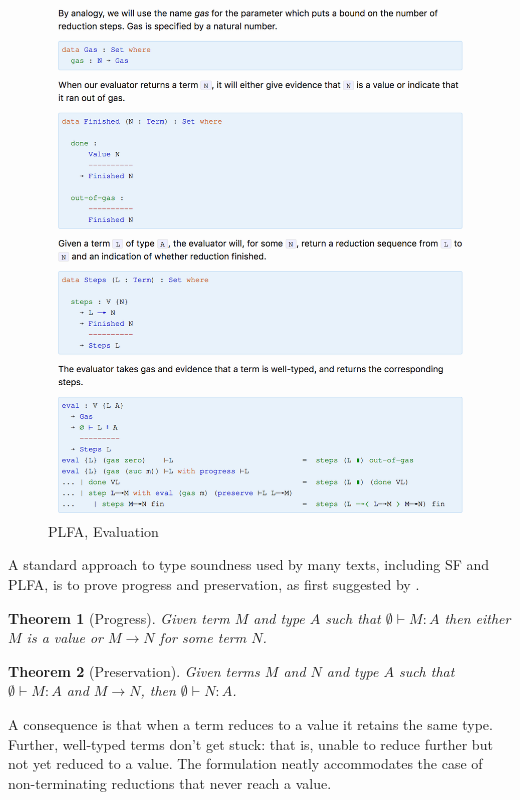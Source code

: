 \documentclass[preprint,authoryear]{elsarticle}
\newtheorem{theorem}{Theorem}
\begin{document}
\begin{figure}
  \includegraphics[width=\textwidth]{figures/plfa-eval.png}
  \caption{PLFA, Evaluation}
  \label{fig:plfa-eval}
\end{figure}  

A standard approach to type soundness used by many texts,
including SF and PLFA, is to prove progress and preservation,
as first suggested by \citet{Wright-and-Felleisen-1994}.

\begin{theorem}[Progress] Given term $M$ and type $A$ such that
$\emptyset \vdash M : A$ then either $M$ is a value or
$M \longrightarrow N$ for some term $N$.
\end{theorem}

\begin{theorem}[Preservation] Given terms $M$ and $N$ and type $A$
such that $\emptyset \vdash M : A$ and $M \longrightarrow N$, then
$\emptyset \vdash N : A$.  \end{theorem}

A consequence is that when a term reduces to a value it retains
the same type.  Further, well-typed terms don't get stuck:
that is, unable to reduce further but not yet reduced to a value.
The formulation neatly accommodates the case of non-terminating
reductions that never reach a value.
\end{document}

